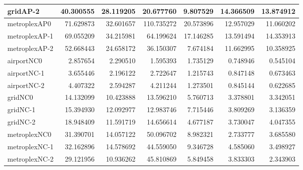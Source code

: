 \begin{longtable}{|l|r|r|r|r|r|r|}
gridAP-2 & 40.300555 & 28.119205 & 20.677760 & 9.807529 & 14.366509 & 13.874912 \\ \hline
metroplexAP0 & 71.629873 & 32.601657 & 110.735272 & 20.573896 & 12.957029 & 11.060202 \\ \hline
metroplexAP-1 & 69.055209 & 34.215981 & 64.199624 & 17.146285 & 13.591494 & 14.353913 \\ \hline
metroplexAP-2 & 52.668443 & 24.658172 & 36.150307 & 7.674184 & 11.662995 & 10.358925 \\ \hline
airportNC0 & 2.857654 & 2.290510 & 1.595393 & 1.735129 & 0.748946 & 0.545104 \\ \hline
airportNC-1 & 3.655446 & 2.196122 & 2.722647 & 1.215743 & 0.847148 & 0.673463 \\ \hline
airportNC-2 & 4.407322 & 2.594287 & 4.211244 & 1.273501 & 0.845144 & 0.622685 \\ \hline
gridNC0 & 14.132099 & 10.423888 & 13.596210 & 5.760713 & 3.378801 & 3.342051 \\ \hline
gridNC-1 & 15.394930 & 12.092977 & 12.983746 & 7.715446 & 3.809269 & 3.136359 \\ \hline
gridNC-2 & 18.948409 & 11.591719 & 14.656614 & 4.677187 & 3.730047 & 4.047355 \\ \hline
metroplexNC0 & 31.390701 & 14.057122 & 50.096702 & 8.982321 & 2.733777 & 3.685580 \\ \hline
metroplexNC-1 & 32.162896 & 14.578692 & 44.559050 & 9.346728 & 4.585060 & 3.498927 \\ \hline
metroplexNC-2 & 29.121956 & 10.936262 & 45.810869 & 5.849458 & 3.833303 & 2.343903 \\ \hline
\end{longtable}
